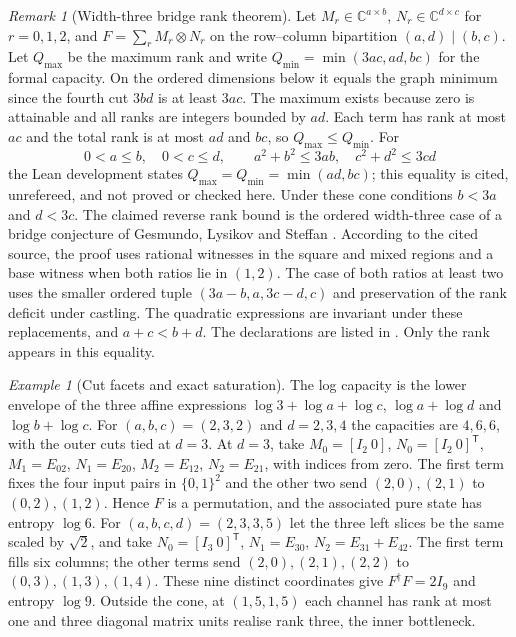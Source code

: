 \documentclass[aps,pra,onecolumn,superscriptaddress,nofootinbib,10pt]{revtex4-2}
\theoremstyle{definition}
\theoremstyle{remark}
\newtheorem{remark}[theorem]{Remark}
\newtheorem{example}[theorem]{Example}
\begin{document}
\begin{remark}[Width-three bridge rank theorem]\label{ub:bridge}
Let $M_r\in\mathbb C^{a\times b}$,
$N_r\in\mathbb C^{d\times c}$ for $r=0,1,2$, and
$F=\sum_rM_r\otimes N_r$ on the row--column bipartition
$(a,d)\mid(b,c)$. Let $Q_{\max}$ be the maximum rank and
write $Q_{\min}=\min(3ac,ad,bc)$ for the formal capacity.
On the ordered dimensions below it equals the graph minimum since
the fourth cut $3bd$ is at least $3ac$. The maximum exists
because zero is attainable and all ranks are integers bounded by
$ad$. Each term has rank at most $ac$ and the total rank is at most
$ad$ and $bc$, so $Q_{\max}\le Q_{\min}$. For
\[
 0<a\le b,\quad 0<c\le d,\qquad
 a^2+b^2\le3ab,\quad c^2+d^2\le3cd
\]
the Lean development \cite{ub:lean} states $Q_{\max}=Q_{\min}=\min(ad,bc)$; this
equality is cited, unrefereed, and not proved or checked here.
Under these cone conditions $b<3a$ and $d<3c$. The claimed reverse
rank bound is the ordered
width-three case of a bridge conjecture of Gesmundo, Lysikov and
Steffan \cite{ub:gls}. According to the cited source, the proof uses rational witnesses
in the square and mixed regions and a base witness when both
ratios lie in $(1,2)$. The case of both ratios at least two uses
the smaller ordered tuple $(3a-b,a,3c-d,c)$ and preservation of the
rank deficit under castling. The quadratic expressions are invariant
under these replacements, and $a+c<b+d$. The declarations are listed
in \cite{ub:lean}.  Only the rank appears in this equality.
\end{remark}

\begin{example}[Cut facets and exact saturation]\label{ub:bridgeexamples}
The log capacity is the lower envelope of the three affine expressions
$\log3+\log a+\log c$, $\log a+\log d$ and $\log b+\log c$.
For $(a,b,c)=(2,3,2)$ and $d=2,3,4$ the capacities are $4,6,6$,
with the outer cuts tied at $d=3$. At $d=3$, take
$M_0=[I_2\ 0]$, $N_0=[I_2\ 0]^{\mathsf T}$,
$M_1=E_{02}$, $N_1=E_{20}$, $M_2=E_{12}$, $N_2=E_{21}$,
with indices from zero. The first term fixes the four input
pairs in $\{0,1\}^2$ and the other two send $(2,0),(2,1)$ to
$(0,2),(1,2)$. Hence $F$ is a permutation, and the associated
pure state has entropy $\log6$.
For $(a,b,c,d)=(2,3,3,5)$ let the three left slices be the same
scaled by $\sqrt2$, and take $N_0=[I_3\ 0]^{\mathsf T}$,
$N_1=E_{30}$, $N_2=E_{31}+E_{42}$. The first term fills six
columns; the other terms send $(2,0),(2,1),(2,2)$ to
$(0,3),(1,3),(1,4)$. These nine distinct coordinates give
$F^\dagger F=2I_9$ and entropy $\log9$. Outside the cone, at
$(1,5,1,5)$ each channel has rank at most one and three diagonal
matrix units realise rank three, the inner bottleneck.
\end{example}
\end{document}
